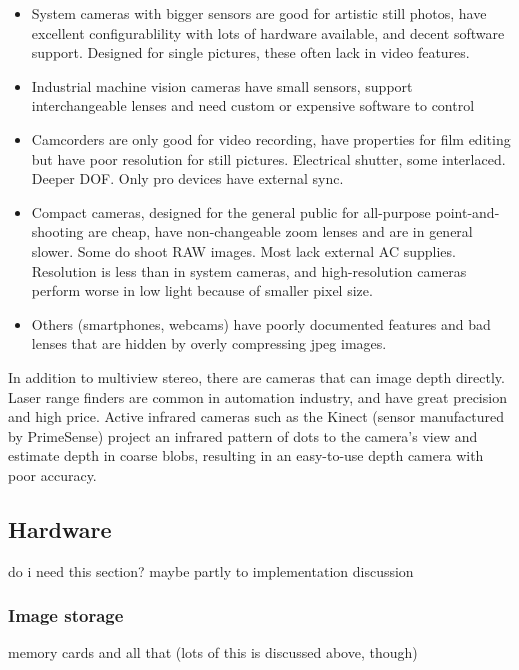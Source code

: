 \begin{itemize}
	\item System cameras with bigger sensors are good for artistic still photos, have excellent configurablility with lots of hardware available, and decent software support. Designed for single pictures, these often lack in video features.
	\item Industrial machine vision cameras have small sensors, support interchangeable lenses and need custom or expensive software to control
	\item Camcorders are only good for video recording, have properties for film editing but have poor resolution for still pictures. Electrical shutter, some interlaced. Deeper DOF. Only pro devices have external sync.
	\item Compact cameras, designed for the general public for all-purpose point-and-shooting are cheap, have non-changeable zoom lenses and are in general slower. Some do shoot RAW images. Most lack external AC supplies. Resolution is less than in system cameras, and high-resolution cameras perform worse in low light because of smaller pixel size.
	\item Others (smartphones, webcams) have poorly documented features and bad lenses that are hidden by overly compressing jpeg images.
\end{itemize}

In addition to multiview stereo, there are cameras that can image depth directly.
Laser range finders are common in automation industry, and have great precision and high price.
Active infrared cameras such as the Kinect (sensor manufactured by PrimeSense) project an infrared pattern of dots to the camera's view and estimate depth in coarse blobs, resulting in an easy-to-use depth camera with poor accuracy.


\subsection{Hardware} %

do i need this section? maybe partly to implementation discussion

\subsubsection{Image storage}

memory cards and all that (lots of this is discussed above, though)

